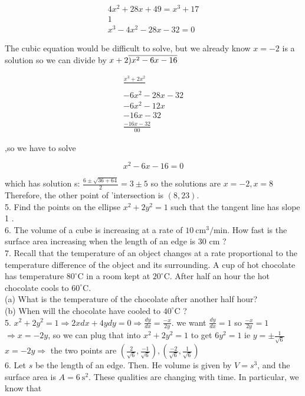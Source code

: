 \documentclass[10pt]{article}
\newcommand\longdiv[1]{\overline{\smash{)}#1}}
\begin{document}
$$
\begin{gathered}
4 x^{2}+28 x+49=x^{3}+17 \\
1 \\
x^{3}-4 x^{2}-28 x-32=0
\end{gathered}
$$

The cubic equation would be difficult to solve, but we already know $x=-2$ is a solution so we can divide by $x + 2 \longdiv { x ^ { 2 } - 6 x - 1 6 }$

$$
\begin{array}{r}
\frac{x^{3}+2 x^{2}}{} \\
-6 x^{2}-28 x-32 \\
-6 x^{2}-12 x \\
-16 x-32 \\
\frac{-16 x-32}{00}
\end{array}
$$

,so we have to solve

$$
x^{2}-6 x-16=0
$$

which has solution s: $\frac{6 \pm \sqrt{36+64}}{2}=3 \pm 5$ so the solutions are $x=-2, x=8$\\
Therefore, the other point of 'intersection is $(8,23)$.\\
5. Find the points on the ellipse $x^{2}+2 y^{2}=1$ such that the tangent line has slope 1 .\\
6. The volume of a cube is increasing at a rate of $10 \mathrm{~cm}^{3} / \mathrm{min}$. How fast is the surface area increasing when the length of an edge is 30 cm ?\\
7. Recall that the temperature of an object changes at a rate proportional to the temperature difference of the object and its surrounding. A cup of hot chocolate has temperature $80^{\circ} \mathrm{C}$ in a room kept at $20^{\circ} \mathrm{C}$. After half an hour the hot chocolate cools to $60^{\circ} \mathrm{C}$.\\
(a) What is the temperature of the chocolate after another half hour?\\
(b) When will the chocolate have cooled to $40^{\circ} \mathrm{C}$ ?\\
5. $x^{2}+2 y^{2}=1 \Rightarrow 2 x d x+4 y d y=0 \Rightarrow \frac{d y}{d x}=\frac{-x}{2 y}$. we want $\frac{d y}{d x}=1$ so $\frac{-x}{2 y}=1$\\
$\Rightarrow x=-2 y$, so we can plug that into $x^{2}+2 y^{2}=1$ to get $6 y^{2}=1$ ie $y= \pm \frac{1}{\sqrt{6}}$\\
$x=-2 y \Rightarrow$ the two points are $\left(\frac{2}{\sqrt{6}}, \frac{-1}{\sqrt{6}}\right),\left(\frac{-2}{\sqrt{6}}, \frac{1}{\sqrt{6}}\right)$\\
6. Let $s$ be the length of an edge. Then. He volume is given by $V=s^{3}$, and the surface area is $A=6 \mathrm{~s}^{2}$. These qualities are changing with time. In particular, we know that
\end{document}
